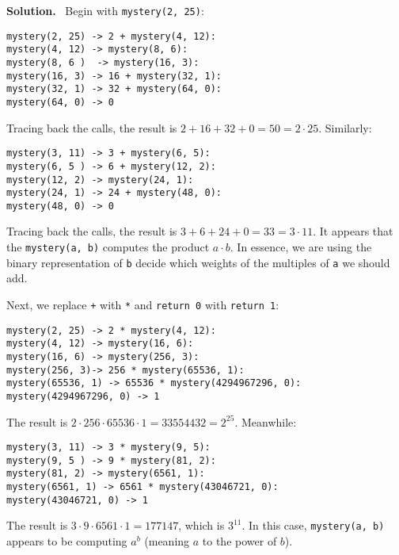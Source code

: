 \documentclass[12pt, a4paper]{article}
\newenvironment{sol}[1][Solution]
{\par\medskip\noindent \textbf{#1.} }
{\medskip}
\begin{document}
	\begin{sol}
		\
		Begin with \texttt{mystery(2, 25)}:
		\begin{lstlisting}
mystery(2, 25) -> 2 + mystery(4, 12):
mystery(4, 12) -> mystery(8, 6):
mystery(8, 6 )  -> mystery(16, 3):
mystery(16, 3) -> 16 + mystery(32, 1):
mystery(32, 1) -> 32 + mystery(64, 0):
mystery(64, 0) -> 0
		\end{lstlisting}
		Tracing back the calls, the result is $2 + 16 + 32 + 0 = 50 = 2\cdot 25$.
		Similarly:
		\begin{lstlisting}
mystery(3, 11) -> 3 + mystery(6, 5):
mystery(6, 5 ) -> 6 + mystery(12, 2):
mystery(12, 2) -> mystery(24, 1):
mystery(24, 1) -> 24 + mystery(48, 0):
mystery(48, 0) -> 0
		\end{lstlisting}
		Tracing back the calls, the result is $3 + 6 + 24 + 0 = 33 = 3\cdot 11$.
		It appears that the \texttt{mystery(a, b)} computes the product $a\cdot b$.
		In essence, we are using the binary representation of \texttt{b} decide which
		weights of the multiples of \texttt{a} we should add.

		Next, we replace \texttt{+} with \texttt{*} and \texttt{return 0} with \texttt{return 1}:
		\begin{lstlisting}
mystery(2, 25) -> 2 * mystery(4, 12):
mystery(4, 12) -> mystery(16, 6):
mystery(16, 6) -> mystery(256, 3):
mystery(256, 3)-> 256 * mystery(65536, 1):
mystery(65536, 1) -> 65536 * mystery(4294967296, 0):
mystery(4294967296, 0) -> 1
		\end{lstlisting}
		The result is $2 \cdot 256 \cdot 65536 \cdot 1 = 33554432 = 2^{25}$.
		Meanwhile:
		\begin{lstlisting}
mystery(3, 11) -> 3 * mystery(9, 5):
mystery(9, 5 ) -> 9 * mystery(81, 2):
mystery(81, 2) -> mystery(6561, 1):
mystery(6561, 1) -> 6561 * mystery(43046721, 0):
mystery(43046721, 0) -> 1
		\end{lstlisting}
		The result is $3\cdot 9\cdot 6561\cdot 1 = 177147$, which is $3^{11}$.
		In this case, \texttt{mystery(a, b)} appears to be computing $a^b$ (meaning
		$a$ to the power of $b$).
	\end{sol}
	\pagebreak
	\printbibliography
\end{document}
